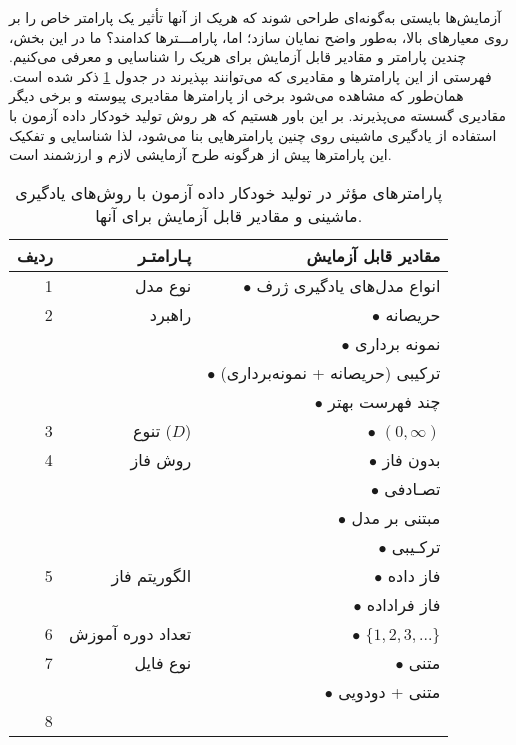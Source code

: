 آزمایش‌ها بایستی به‌گونه‌ای طراحی شوند که هریک از آنها تأثیر یک پارامتر خاص را بر روی معیارهای بالا، به‌طور واضح نمایان سازد؛ اما، پارامـــترها کدامند؟ ما در این بخش، چندین پارامتر و مقادیر قابل آزمایش برای هریک را شناسایی و معرفی می‌کنیم. فهرستی از این پارامترها و مقادیری که می‌توانند بپذیرند در جدول \ref{tabel:all_parameters} ذکر شده است. همان‌طور که مشاهده می‌شود برخی از پارامترها مقادیری پیوسته و برخی دیگر مقادیری گسسته می‌پذیرند. بر این باور هستیم که هر روش تولید خودکار داده آزمون با استفاده از یادگیری ماشینی روی چنین پارامترهایی بنا می‌شود، لذا شناسایی و تفکیک این پارامترها پیش از هرگونه طرح آزمایشی لازم و ارزشمند است.

\begin{table}%
	\caption[پارامترهای مؤثر در تولید خودکار داده آزمون با روش‌های یادگیری ماشینی و مقادیر قابل آزمایش برای آنها]{
		پارامترهای مؤثر در تولید خودکار داده آزمون با روش‌های یادگیری ماشینی و مقادیر قابل آزمایش برای آنها.}
	\label{tabel:all_parameters}
	\centering
	\onehalfspacing
	\begin{tabularx}{0.95\linewidth}{rrr}
		\toprule[1.5pt]
		 ردیف  &
		 پـارامتـر \hspace{2cm} &
		 مقادیر قابل آزمایش 
		\\
		\midrule[1.5pt] 
		1 &
		 نوع مدل & 
		$\bullet$
		 انواع مدل‌های یادگیری ژرف 
		\\
		\hline
		 2 &
		 راهبرد & 
		 $\bullet$
		 حریصانه 
		 \\
		  &
		  &  
		  $\bullet$
		  نمونه برداری
		 \\
		  &
		  &  
		  $\bullet$
		  ترکیبی (حریصانه + نمونه‌برداری) 
		 \\
		  &
		  &  
		  $\bullet$
		  چند فهرست بهتر 
		 \\
		\hline
		 3 &  تنوع 
		 ($D$) & 
		 $\bullet$ $(0, \infty)$
		\\
		\hline
		 4 &
		 روش فاز &
		 $\bullet$
		 بدون فاز 
		 \\
		  &
		  &
		 $\bullet$
		 تصـادفی
		 \\
		  &
		 &
		 $\bullet$
		 مبتنی بر مدل 
		 \\
		  &
		  &
		  $\bullet$
		 ترکـیبی
		 \\
		\hline
		5 & 
		الگوریتم فاز & 
		$\bullet$
		فاز داده
		\\
		&
		&
		$\bullet$
		فاز فراداده 
		\\
		\hline
		 6 &  تعداد دوره آموزش & 
		 $\bullet$ $\{1,2,3,...\}$
		\\
		\hline
		7 &
		نوع فایل &
		$\bullet$
		متنی
		\\
		&
		&
		$\bullet$
		متنی + دودویی
		\\
		\hline
		8 &
	

\end{tabularx}
\end{table}
